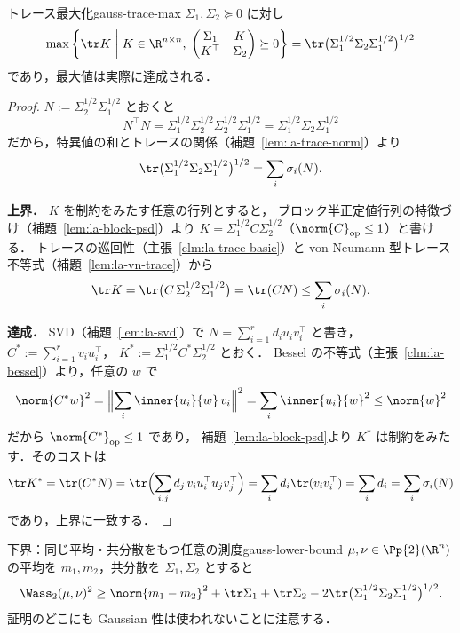 \begin{proposition}{トレース最大化}{gauss-trace-max}
  $\Sigma_1,\Sigma_2\succeq0$ に対し
  \[
    \max\left\{\tr K
    \;\middle|\;
    K\in\R^{n\times n},\;
    \begin{pmatrix}\Sigma_1&K\\K^\top&\Sigma_2\end{pmatrix}\succeq0
    \right\}
    =\tr\bigl(\Sigma_1^{1/2}\Sigma_2\Sigma_1^{1/2}\bigr)^{1/2}
  \]
  であり，最大値は実際に達成される．
\end{proposition}

\begin{proof}
  $N:=\Sigma_2^{1/2}\Sigma_1^{1/2}$ とおくと
  \[
    N^\top N
    =\Sigma_1^{1/2}\Sigma_2^{1/2}\Sigma_2^{1/2}\Sigma_1^{1/2}
    =\Sigma_1^{1/2}\Sigma_2\Sigma_1^{1/2}
  \]
  だから，特異値の和とトレースの関係（補題~\ref{lem:la-trace-norm}）より
  \[
    \tr\bigl(\Sigma_1^{1/2}\Sigma_2\Sigma_1^{1/2}\bigr)^{1/2}
    =\sum_i\sigma_i(N).
  \]

  \textbf{上界．}
  $K$ を制約をみたす任意の行列とすると，
  ブロック半正定値行列の特徴づけ（補題~\ref{lem:la-block-psd}）より
  $K=\Sigma_1^{1/2}C\Sigma_2^{1/2}$（$\norm{C}_{\mathrm{op}}\leq1$）と書ける．
  トレースの巡回性（主張~\ref{clm:la-trace-basic}）と
  von Neumann 型トレース不等式（補題~\ref{lem:la-vn-trace}）から
  \[
    \tr K
    =\tr\bigl(C\,\Sigma_2^{1/2}\Sigma_1^{1/2}\bigr)
    =\tr(CN)
    \leq\sum_i\sigma_i(N).
  \]

  \textbf{達成．}
  SVD（補題~\ref{lem:la-svd}）で $N=\sum_{i=1}^rd_iu_iv_i^\top$ と書き，
  $C^*:=\sum_{i=1}^rv_iu_i^\top$，
  $K^*:=\Sigma_1^{1/2}C^*\Sigma_2^{1/2}$ とおく．
  Bessel の不等式（主張~\ref{clm:la-bessel}）より，任意の $w$ で
  \[
    \norm{C^*w}^2
    =\Bigl\lVert\sum_i\inner{u_i}{w}\,v_i\Bigr\rVert^2
    =\sum_i\inner{u_i}{w}^2
    \leq\norm{w}^2
  \]
  だから $\norm{C^*}_{\mathrm{op}}\leq1$ であり，
  補題~\ref{lem:la-block-psd}より $K^*$ は制約をみたす．そのコストは
  \[
    \tr K^*
    =\tr(C^*N)
    =\tr\Bigl(\sum_{i,j}d_j\,v_iu_i^\top u_jv_j^\top\Bigr)
    =\sum_{i}d_i\tr(v_iv_i^\top)
    =\sum_id_i
    =\sum_i\sigma_i(N)
  \]
  であり，上界に一致する．
\end{proof}

\begin{proposition}{下界：同じ平均・共分散をもつ任意の測度}{gauss-lower-bound}
  $\mu,\nu\in\Pp{2}(\R^n)$ の平均を $m_1,m_2$，共分散を
  $\Sigma_1,\Sigma_2$ とすると
  \[
    \Wass_2(\mu,\nu)^2
    \geq
    \norm{m_1-m_2}^2
    +\tr\Sigma_1+\tr\Sigma_2
    -2\tr\bigl(\Sigma_1^{1/2}\Sigma_2\Sigma_1^{1/2}\bigr)^{1/2}.
  \]
  証明のどこにも Gaussian 性は使われないことに注意する．
\end{proposition}

